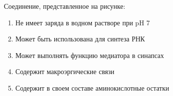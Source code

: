 
Соединение, представленное на рисунке:


\begin{enumerate}
    \item Не имеет заряда в водном растворе при pH 7
    \item Может быть использована для синтеза РНК
    \item Может выполнять функцию медиатора в синапсах 
    \item Содержит макроэргические связи 
    \item Содержит в своем составе аминокислотные остатки
\end{enumerate}




